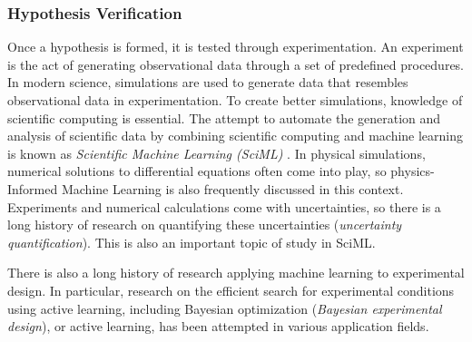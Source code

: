\documentclass{article}
\begin{document}

\subsubsection{Hypothesis Verification }

Once a hypothesis is formed, it is tested through experimentation. An experiment is the act of generating observational data through a set of predefined procedures. In modern science, simulations are used to generate data that resembles observational data in experimentation. To create better simulations, knowledge of scientific computing is essential. The attempt to automate the generation and analysis of scientific data by combining scientific computing and machine learning is known as \textit{Scientific Machine Learning (SciML)} \cite{baker2019basic}. In physical simulations, numerical solutions to differential equations often come into play, so physics-Informed Machine Learning is also frequently discussed in this context. Experiments and numerical calculations come with uncertainties, so there is a long history of research on quantifying these uncertainties (\textit{uncertainty quantification}). This is also an important topic of study in SciML.

There is also a long history of research applying machine learning to experimental design. In particular, research on the efficient search for experimental conditions using active learning, including Bayesian optimization (\textit{Bayesian experimental design}), or active learning, has been attempted in various application fields.

\end{document}
